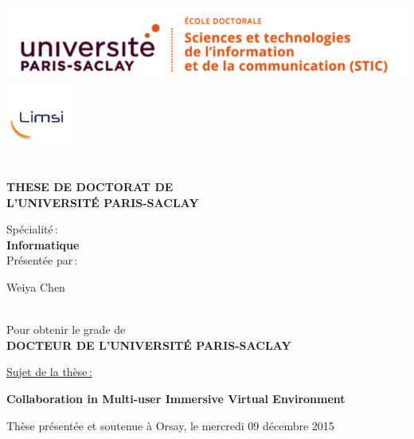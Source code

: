\begin{titlepage}

\includegraphics[height=2.cm]{./logos/logo_paris_saclay}\hfill
\includegraphics[height=2.2cm]{./logos/LogoLimsi2015}\hfill
\\
\\

\begin{center}
  \begin{Large}
    \textbf{THESE DE DOCTORAT DE\\ L'UNIVERSIT\'E PARIS-SACLAY\\}
  \end{Large}
  Sp\'ecialit\'e\,:\\
  \textbf{Informatique}\\ 
  Pr\'esent\'ee par\,:\\ 
  \begin{LARGE}
    Weiya Chen\end{LARGE}\\
  Pour obtenir le grade de\\
  \textbf{DOCTEUR DE L'UNIVERSIT\'E PARIS-SACLAY}
\end{center}

\noindent \underline{Sujet de la thèse\,:}\\
\begin{center}
  \begin{Large}
    {\textbf{Collaboration in Multi-user Immersive Virtual Environment}}
  \end{Large}
\end{center}

Thèse présentée et soutenue à Orsay, le mercredi 09 décembre 2015\\


\end{titlepage}
